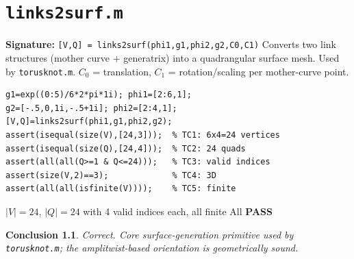 \documentclass[12pt,a4paper]{report}
\newcommand{\mf}[1]{\texttt{#1}}
\newcommand{\PASS}{\textcolor{green!60!black}{\textbf{PASS}}}
\newtheorem{concl}{Conclusion}[chapter]
\begin{document}
\chapter{\mf{links2surf.m}}
\begin{tcolorbox}[Abox,title=Analysis]
\textbf{Signature:} \lstinline|[V,Q] = links2surf(phi1,g1,phi2,g2,C0,C1)|\quad
Converts two link structures (mother curve + generatrix) into a quadrangular surface mesh. Used by \mf{torusknot.m}. $C_0$ = translation, $C_1$ = rotation/scaling per mother-curve point.
\end{tcolorbox}
\begin{lstlisting}[caption={Tests for links2surf.m}]
g1=exp((0:5)/6*2*pi*1i); phi1=[2:6,1];
g2=[-.5,0,1i,-.5+1i]; phi2=[2:4,1];
[V,Q]=links2surf(phi1,g1,phi2,g2);
assert(isequal(size(V),[24,3]));  % TC1: 6x4=24 vertices
assert(isequal(size(Q),[24,4]));  % TC2: 24 quads
assert(all(all(Q>=1 & Q<=24)));   % TC3: valid indices
assert(size(V,2)==3);             % TC4: 3D
assert(all(all(isfinite(V))));    % TC5: finite
\end{lstlisting}
\begin{tcolorbox}[Pbox,title=TC1--TC5 -- All pass]
$|V|=24$, $|Q|=24$ with 4 valid indices each, all finite \quad All \PASS
\end{tcolorbox}
\begin{concl}
Correct. Core surface-generation primitive used by \mf{torusknot.m}; the amplitwist-based orientation is geometrically sound.
\end{concl}

\end{document}
